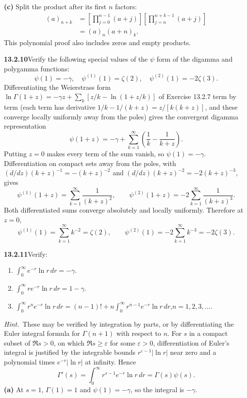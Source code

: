 \textbf{(c)} Split the product after its first $n$ factors:
\begin{align*}
(a)_{n+k}
&=\left[\prod_{j=0}^{n-1}(a+j)\right]
  \left[\prod_{j=n}^{n+k-1}(a+j)\right]\\
&=\boxed{(a)_n(a+n)_k}.
\end{align*}
This polynomial proof also includes zeros and empty products.


\par\bigskip
\noindent\textbf{13.2.10}\quad Verify the following special values of the
$\psi$ form of the digamma and polygamma functions:
\[
\psi(1)=-\gamma,\quad\psi^{(1)}(1)=\zeta(2),\quad
\psi^{(2)}(1)=-2\zeta(3).
\]
\solution
Differentiating the Weierstrass form
$\ln\Gamma(1+z)=-\gamma z+\sum_k[z/k-\ln(1+z/k)]$ of
Exercise 13.2.7 term by term (each term has derivative
$1/k-1/(k+z)=z/[k(k+z)]$, and these converge locally uniformly
away from the poles) gives the convergent digamma representation
\[
\psi(1+z)=-\gamma+
\sum_{k=1}^{\infty}\left(\frac1k-\frac1{k+z}\right).
\]
Putting $z=0$ makes every term of the sum vanish, so
$\boxed{\psi(1)=-\gamma}$.
Differentiation on compact sets away from the poles, with
$(d/dz)(k+z)^{-1}=-(k+z)^{-2}$ and $(d/dz)(k+z)^{-2}=-2(k+z)^{-3}$,
gives
\[
\psi^{(1)}(1+z)=\sum_{k=1}^{\infty}\frac1{(k+z)^2},
\qquad
\psi^{(2)}(1+z)=-2\sum_{k=1}^{\infty}\frac1{(k+z)^3}.
\]
Both differentiated sums converge absolutely and locally
uniformly.  Therefore at $z=0$,
\[
\boxed{\psi^{(1)}(1)=\sum_{k=1}^{\infty}k^{-2}=\zeta(2)},
\qquad
\boxed{\psi^{(2)}(1)=-2\sum_{k=1}^{\infty}k^{-3}=-2\zeta(3)}.
\]


\par\bigskip
\noindent\textbf{13.2.11}\quad Verify:
\begin{enumerate}
\item[(a)] $\displaystyle\int_{0}^{\infty}e^{-r}\ln r\,dr=-\gamma$.
\item[(b)] $\displaystyle\int_{0}^{\infty}re^{-r}\ln r\,dr=1-\gamma$.
\item[(c)] $\displaystyle\int_{0}^{\infty}r^{n}e^{-r}\ln r\,dr
  =(n-1)!+n\int_{0}^{\infty}r^{n-1}e^{-r}\ln r\,dr$,\quad$n=1,2,3,\ldots$.
\end{enumerate}
\emph{Hint.}~These may be verified by integration by parts, or by
differentiating the Euler integral formula for $\Gamma(n+1)$ with respect to
$n$.
\solution
For $s$ in a compact subset of $\Re s>0$, on which
$\Re s\ge\varepsilon$ for some $\varepsilon>0$, differentiation of
Euler's integral is justified by the integrable bounds
$r^{\varepsilon-1}|\ln r|$ near zero and a polynomial times
$e^{-r}|\ln r|$ at infinity.  Hence
\[
\Gamma'(s)=\int_0^\infty r^{s-1}e^{-r}\ln r\,dr
=\Gamma(s)\psi(s).
\]
\textbf{(a)} At $s=1$, $\Gamma(1)=1$ and $\psi(1)=-\gamma$,
so the integral is $\boxed{-\gamma}$.

